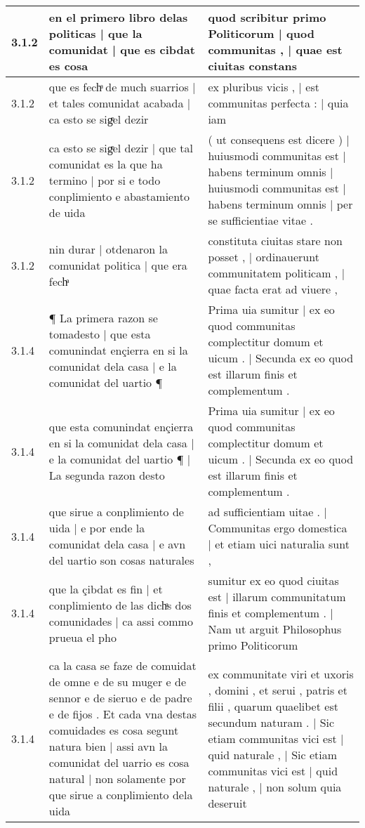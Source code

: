 \begin{tabular}{|p{1cm}|p{6.5cm}|p{6.5cm}|}
3.1.2 & en el primero libro delas politicas | que la comunidat | que es cibdat es cosa & quod scribitur primo Politicorum | quod communitas , | quae est ciuitas constans \\\hline
3.1.2 & que es fechͣ de much suarrios | et tales comunidat acabada | ca esto se sigͤel dezir & ex pluribus vicis , | est communitas perfecta : | quia iam \\\hline
3.1.2 & ca esto se sigͤel dezir | que tal comunidat es la que ha termino | por si e todo conplimiento e abastamiento de uida & ( ut consequens est dicere ) | huiusmodi communitas est | habens terminum omnis | huiusmodi communitas est | habens terminum omnis | per se sufficientiae vitae . \\\hline
3.1.2 & nin durar | otdenaron la comunidat politica | que era fechͣ & constituta ciuitas stare non posset , | ordinauerunt communitatem politicam , | quae facta erat ad viuere , \\\hline
3.1.4 & ¶ La primera razon se tomadesto | que esta comunindat ençierra en si la comunidat dela casa | e la comunidat del uartio ¶ & Prima uia sumitur | ex eo quod communitas complectitur domum et uicum . | Secunda ex eo quod est illarum finis et complementum . \\\hline
3.1.4 & que esta comunindat ençierra en si la comunidat dela casa | e la comunidat del uartio ¶ | La segunda razon desto & Prima uia sumitur | ex eo quod communitas complectitur domum et uicum . | Secunda ex eo quod est illarum finis et complementum . \\\hline
3.1.4 & que sirue a conplimiento de uida | e por ende la comunidat dela casa | e avn del uartio son cosas naturales & ad sufficientiam uitae . | Communitas ergo domestica | et etiam uici naturalia sunt , \\\hline
3.1.4 & que la çibdat es fin | et conplimiento de las dichͣs dos comunidades | ca assi commo prueua el pho & sumitur ex eo quod ciuitas est | illarum communitatum finis et complementum . | Nam ut arguit Philosophus primo Politicorum \\\hline
3.1.4 & ca la casa se faze de comuidat de omne e de su muger e de sennor e de sieruo e de padre e de fijos . Et cada vna destas comuidades es cosa segunt natura bien | assi avn la comunidat del uarrio es cosa natural | non solamente por que sirue a conplimiento dela uida & ex communitate viri et uxoris , domini , et serui , patris et filii , quarum quaelibet est secundum naturam . | Sic etiam communitas vici est | quid naturale , | Sic etiam communitas vici est | quid naturale , | non solum quia deseruit \\\hline

\end{tabular}
